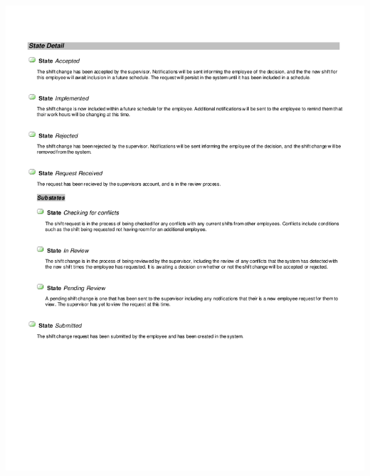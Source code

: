 \documentclass[letterpaper,12pt]{report}
\begin{document}
\includegraphics[scale=0.9,trim=15mm 20mm 25mm 20mm]{diagrams/ad_reqshift2.pdf}
\newpage
\end{document}
